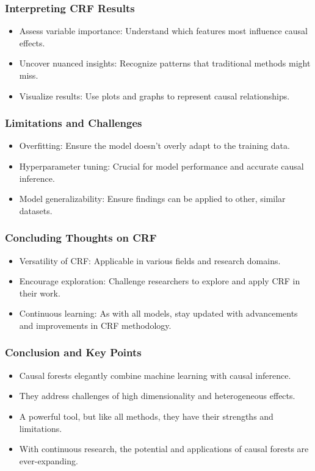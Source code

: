 \documentclass{beamer}
\begin{document}
\begin{frame}
\frametitle{Interpreting CRF Results}
\begin{itemize}
    \item Assess variable importance: Understand which features most influence causal effects.
    \item Uncover nuanced insights: Recognize patterns that traditional methods might miss.
    \item Visualize results: Use plots and graphs to represent causal relationships.
\end{itemize}
\end{frame}

\begin{frame}
\frametitle{Limitations and Challenges}
\begin{itemize}
    \item Overfitting: Ensure the model doesn't overly adapt to the training data.
    \item Hyperparameter tuning: Crucial for model performance and accurate causal inference.
    \item Model generalizability: Ensure findings can be applied to other, similar datasets.
\end{itemize}
\end{frame}

\begin{frame}
\frametitle{Concluding Thoughts on CRF}
\begin{itemize}
    \item Versatility of CRF: Applicable in various fields and research domains.
    \item Encourage exploration: Challenge researchers to explore and apply CRF in their work.
    \item Continuous learning: As with all models, stay updated with advancements and improvements in CRF methodology.
\end{itemize}
\end{frame}


\begin{frame}
\frametitle{Conclusion and Key Points}
\begin{itemize}
    \item Causal forests elegantly combine machine learning with causal inference.
    \item They address challenges of high dimensionality and heterogeneous effects.
    \item A powerful tool, but like all methods, they have their strengths and limitations.
    \item With continuous research, the potential and applications of causal forests are ever-expanding.
\end{itemize}
\end{frame}
\end{document}
